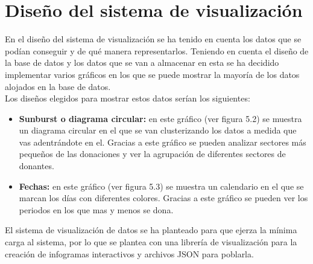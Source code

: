 \section{Diseño del sistema de visualización}
En el diseño del sistema de visualización se ha tenido en cuenta los datos que se podían conseguir y de qué manera representarlos. Teniendo en cuenta el diseño de la base de datos y los datos que se van a almacenar en esta se ha decidido implementar varios gráficos en los que se puede mostrar la mayoría de los datos alojados en la base de datos.\\

Los diseños elegidos para mostrar estos datos serían los siguientes:

\begin{itemize}
	\item \textbf{Sunburst o diagrama circular:} en este gráfico (ver figura 5.2) se muestra un diagrama circular en el que se van clusterizando los datos a medida que vas adentrándote en el. Gracias a este gráfico se pueden analizar sectores más pequeños de las donaciones y ver la agrupación de diferentes sectores de donantes.
	\item \textbf{Fechas:} en este gráfico (ver figura 5.3) se muestra un calendario en el que se marcan los días con diferentes colores. Gracias a este gráfico se pueden ver los periodos en los que mas y menos se dona.
\end{itemize}

El sistema de visualización de datos se ha planteado para que ejerza la mínima carga al sistema, por lo que se plantea con una librería de visualización para la creación de infogramas interactivos y archivos JSON para poblarla.
